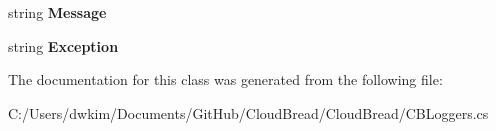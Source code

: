 \begin{DoxyCompactItemize}
\item 
string {\bfseries Message}\hypertarget{class_logger_1_1_logging_1_1_logging_1_1_c_b_a_t_s_message_entity_a65f69f9379e62a38db0c806317e40042}{}\label{class_logger_1_1_logging_1_1_logging_1_1_c_b_a_t_s_message_entity_a65f69f9379e62a38db0c806317e40042}

\item 
string {\bfseries Exception}\hypertarget{class_logger_1_1_logging_1_1_logging_1_1_c_b_a_t_s_message_entity_a83734575c9e288cd515dbc9165370a0a}{}\label{class_logger_1_1_logging_1_1_logging_1_1_c_b_a_t_s_message_entity_a83734575c9e288cd515dbc9165370a0a}

\end{DoxyCompactItemize}


The documentation for this class was generated from the following file\+:\begin{DoxyCompactItemize}
\item 
C\+:/\+Users/dwkim/\+Documents/\+Git\+Hub/\+Cloud\+Bread/\+Cloud\+Bread/C\+B\+Loggers.\+cs\end{DoxyCompactItemize}
